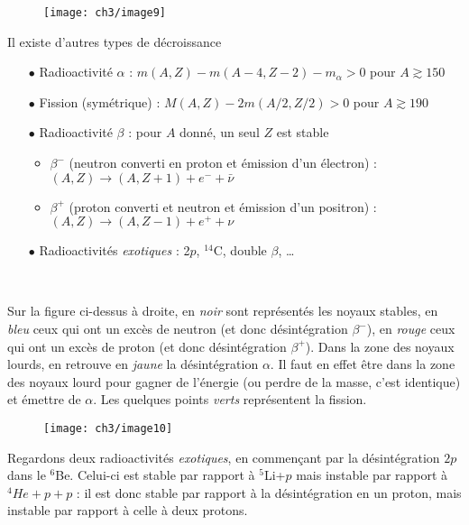 	\begin{wrapfigure}[9]{r}{6cm}
	\vspace{-5mm}
	\texttt{[image: ch3/image9]}
	\end{wrapfigure}
	
Il existe d'autres types de décroissance
\begin{itemize}
\item[$\bullet$] Radioactivité $\alpha$ : $m(A,Z) - m(A-4,Z-2)-m_\alpha > 0$ pour $A\gtrsim 150$
\item[$\bullet$] Fission (symétrique) : $M(A,Z)-2m(A/2,Z/2) >0$ pour $A\gtrsim 190$
\item[$\bullet$] Radioactivité $\beta$ : pour $A$ donné, un seul $Z$ est stable
\begin{itemize}
\item $\beta^-$ (neutron converti en proton et émission d'un électron) : $(A,Z)\to (A,Z+1)+e^-+\bar{\nu}$
\item $\beta^+$ (proton converti et neutron et émission d'un positron) : $(A,Z)\to (A,Z-1)+e^++\nu$
\end{itemize}
\item[$\bullet$] Radioactivités \textit{exotiques} : 2$p$, $^{14}$C, double $\beta$, \dots
\end{itemize}\

Sur la figure ci-dessus à droite, en \textit{noir} sont représentés les noyaux stables, en \textit{bleu}
ceux qui ont un excès de neutron (et donc désintégration $\beta^-$), en \textit{rouge} ceux qui ont un
excès de proton (et donc désintégration $\beta^+$). Dans la zone des noyaux lourds, en retrouve en 
\textit{jaune} la désintégration $\alpha$. Il faut en effet être dans la zone des noyaux lourd pour 
gagner de l'énergie (ou perdre de la masse, c'est identique) et émettre de $\alpha$. Les quelques points
\textit{verts} représentent la fission.\\

	\begin{wrapfigure}[6]{l}{4.5cm}
	\vspace{-8mm}
	\texttt{[image: ch3/image10]}
	\end{wrapfigure} 
Regardons deux radioactivités \textit{exotiques}, en commençant par la désintégration $2p$ dans le $^6$Be. 
Celui-ci est stable par rapport à $^5$Li+$p$ mais instable par rapport à $^4He+p+p$ : il est donc stable
par rapport à la désintégration en un proton, mais instable par rapport à celle à deux protons.\\

